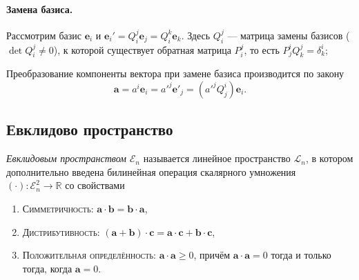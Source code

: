 \begin{enumerate}
\paragraph{Замена базиса.} Рассмотрим базис $\mathbf{e}_i$ и $\mathbf{e}_i' =
Q_i^j \mathbf{e}_j = Q^k_i \mathbf{e}_k$. Здесь $Q^j_i$ --- матрица 
замены базисов ($\det Q^j_i \neq 0$), к которой существует обратная матрица
$P^j_i$, то есть $P^i_j Q^j_k = \delta^i_k$; 

Преобразование компоненты вектора при замене базиса производится по закону
\[
  \mathbf{a} = a^i \mathbf{e}_i = {a'}^j \mathbf{e'}_j = ({a'}^j Q^i_j)
  \mathbf{e}_i.
\]

\subsection{Евклидово пространство}

\begin{definition}
  \emph{Евклидовым пространством} $ \mathcal E_n $ называется линейное
  пространство $\mathcal{L}_n$, в котором дополнительно введена билинейная операция
  скалярного умножения $(\cdot)\colon \mathcal{E}_n^2 \to \mathbb{R}$ со
  свойствами
  \begin{enumerate}
    \item \textsc{Симметричность:} $\mathbf{a} \cdot \mathbf{b} = \mathbf{b} \cdot \mathbf{a}$,
    \item \textsc{Дистрибутивность:} $(\mathbf{a}+\mathbf{b}) \cdot \mathbf{c} = \mathbf{a} \cdot
      \mathbf{c} + \mathbf{b} \cdot \mathbf{c}$,
    \item \textsc{Положительная определённость:} $\mathbf{a} \cdot \mathbf{a} \geqslant 0$, причём $ \mathbf a \cdot
      \mathbf a = 0 $ тогда и только тогда, когда $ \mathbf a = 0 $.
  \end{enumerate}


\end{definition}
\end{enumerate}
